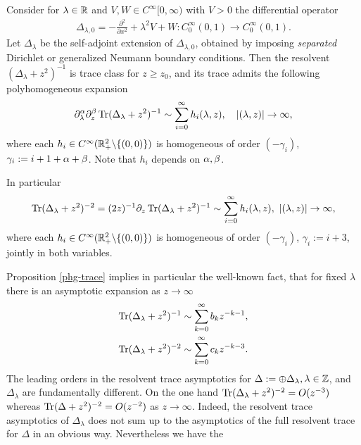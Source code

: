 \begin{prop}\label{phg-trace}
Consider for $\lambda\in \mathbb{R}$ and $V,W \in C^\infty[0,\infty)$ with $V>0$ the differential operator
\begin{align}
\Delta_{\lambda,0}=-\frac{\partial^2}{\partial x^2} + \lambda^2 V + W
: C^{\infty}_0(0,1) \to C^{\infty}_0(0,1).
\end{align} 
Let $\Delta_\lambda$ be the self-adjoint extension of $\Delta_{\lambda,0}$, obtained
by imposing \emph{separated} Dirichlet or generalized Neumann boundary conditions. 
Then the resolvent $(\Delta_\lambda+z^2)^{-1}$ 
is trace class for $z\geq z_0$, 
and its trace admits the following polyhomogeneous expansion 
\begin{align*}
\partial_\lambda^{\mathrm{\alpha}}\partial_z^{\beta}\operatorname{Tr}(\Delta_\lambda+z^2)^{-1} \sim \sum_{i=0}^{\infty} 
h_i (\lambda,z), \quad
|(\lambda,z)| \rightarrow \infty,
\end{align*}
where each $h_i\in C^{\infty}(\mathbb{R}^2_+\backslash \{(0,0)\})$ is homogeneous of order $(-\gamma_i)$, 
$\gamma_i:=i+1+\mathrm{\alpha}+\beta$. Note that $h_i$ depends on $\mathrm{\alpha},\beta$.
\end{prop}

In particular
\begin{align}
\label{trace-2-expansion}
\Tr(\Delta_\lambda+z^2)^{-2} = (2z)^{-1} \partial_z
\Tr(\Delta_\lambda+z^2)^{-1} \sim \sum_{i=0}^\infty h_i (\lambda,z), \ |(\lambda,z)| \to \infty,
\end{align}
where each $h_i\in C^{\infty}(\mathbb{R}^2_+\backslash \{(0,0)\})$
is homogeneous of order $(-\gamma_i)$, $\gamma_i:=i+3$,  jointly in both variables. 

Proposition \ref{phg-trace} implies in particular the well-known fact, that for fixed 
$\lambda$ there is an asymptotic expansion as $z\to \infty$
\begin{align}\label{1.14a}
\operatorname{Tr}(\Delta_\lambda+z^2)^{-1} \sim \sum_{k=0}^\infty b_k z^{-k-1}, \\
\label{1.14b}
\operatorname{Tr}(\Delta_\lambda+z^2)^{-2} \sim \sum_{k=0}^\infty c_k z^{-k-3}.
\end{align}
The leading orders in the resolvent trace asymptotics for $\Delta:=\oplus \Delta_\lambda, \lambda \in \mathbb{Z}$, 
and $\Delta_\lambda$ are fundamentally different. On the one hand $\operatorname{Tr}(\Delta_\lambda+z^2)^{-2}=O(z^{-3})$ 
whereas $\operatorname{Tr}(\Delta+z^2)^{-2}=O(z^{-2})$ as $z\to \infty$. Indeed, the resolvent trace asymptotics of $\Delta_\lambda$ 
does not sum up to the asymptotics of the full resolvent trace for $\Delta$
in an obvious way. Nevertheless we have the

